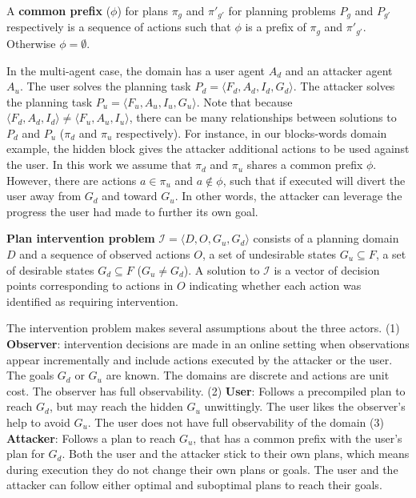A \textbf{common prefix} ($\phi$) for plans $\pi_g$ and $\pi\prime_{g\prime}$ for planning problems $P_g$ and $P_{g\prime}$ respectively is a sequence of actions such that $\phi$ is a prefix of $\pi_g$ and $\pi\prime_{g\prime}$. Otherwise $\phi=\emptyset$.

In the multi-agent case, the domain has a user agent $A_d$ and an attacker agent $A_u$. The user solves the planning task $ P_d = \langle F_d, A_d, I_d, G_d \rangle$. The attacker solves the planning task $ P_u = \langle F_u, A_u, I_u, G_u \rangle$. Note that because $\langle F_d, A_d, I_d\rangle \neq \langle F_u, A_u, I_u\rangle$, there can be many relationships between solutions to $P_d$ and $P_u$ ($\pi_d$ and $\pi_u$ respectively). For instance, in our blocks-words domain example, the hidden block gives the attacker additional actions to be used against the user. In this work we assume that $\pi_d$ and $\pi_u$ shares a common prefix $\phi$. However, there are actions $a\in\pi_u$ and $a \notin \phi$, such that if executed will divert the user away from $G_d$ and toward $G_u$. In other words, the attacker can leverage the progress the user had made to further its own goal.


\textbf{Plan intervention problem} $\mathcal{I} = \langle D, O, G_u, G_d \rangle$ consists of a planning domain $D$ and a sequence of observed actions  $O$, a set of undesirable states $G_u \subseteq F$, a set of desirable states $G_d \subseteq F$ ($G_u \neq G_d$). A solution to $\mathcal{I}$ is a vector of decision points corresponding to actions in $O$ indicating whether each action was identified as requiring intervention. 

The intervention problem makes several assumptions about the three actors. (1) \textbf{Observer}: intervention decisions are made in an online setting when observations appear incrementally and include actions executed by the attacker or the user. The goals $G_d$ or $G_u$ are known. The domains are discrete and actions are unit cost. The observer has full observability. (2) \textbf{User}: Follows a precompiled plan to reach $G_d$, but may reach the hidden $G_u$ unwittingly. The user likes the observer's help to avoid $G_u$. The user does not have full observability of the domain (3) \textbf{Attacker}: Follows a plan to reach $G_u$, that has a common prefix with the user's plan for $G_d$. Both the user and the attacker stick to their own plans, which means during execution they do not change their own plans or goals. The user and the attacker can follow either optimal and suboptimal plans to reach their goals.

